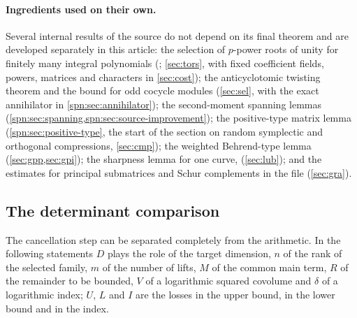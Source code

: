 \paragraph{Ingredients used on their own.}
Several internal results of the source do not depend on its final theorem and are developed
separately in this article: the selection of $p$-power roots of unity for finitely many
integral polynomials (; \cref{sec:tors}, with fixed coefficient
fields, powers, matrices and characters in \cref{sec:cost}); the anticyclotomic twisting
theorem and the bound  for odd cocycle modules
(\cref{sec:sel}, with the exact annihilator in \cref{spn:sec:annihilator}); the second-moment
spanning lemmas (\cref{spn:sec:spanning,spn:sec:source-improvement}); the positive-type matrix
lemma  (\cref{spn:sec:positive-type}, the start of the
section on random symplectic and orthogonal compressions, \cref{sec:cmp}); the weighted Behrend-type lemma
 (\cref{sec:gpp,sec:gpi}); the sharpness lemma for one curve,
 (\cref{sec:lub}); and the estimates for principal
submatrices and Schur complements in the file 
(\cref{sec:gra}).

\subsection{The determinant comparison}\label{src:sec:comparison}
\begingroup\raggedright
{}
\endgroup

The cancellation step can be separated completely from the arithmetic. In the following
statements $D$ plays the role of the target dimension, $n$ of the rank of the selected family,
$m$ of the number of lifts, $M$ of the common main term, $R$ of the remainder to be bounded,
$V$ of a logarithmic squared covolume and $\delta$ of a logarithmic index; $U$, $L$ and $I$
are the losses in the upper bound, in the lower bound and in the index.

